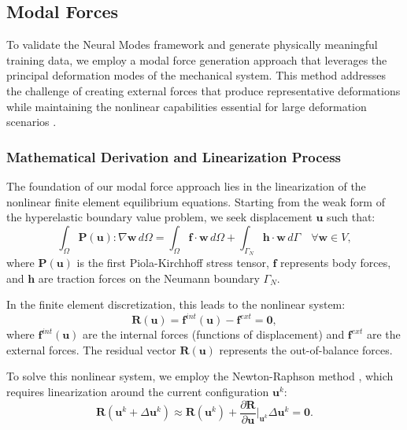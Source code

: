 \subsection{Modal Forces}
\label{sec:modal_forces}

To validate the Neural Modes framework and generate physically meaningful training data, we employ a modal force generation approach that leverages the principal deformation modes of the mechanical system. This method addresses the challenge of creating external forces that produce representative deformations while maintaining the nonlinear capabilities essential for large deformation scenarios \cite{odotDeepPhysicsPhysicsAware2021}.

\subsubsection{Mathematical Derivation and Linearization Process}

The foundation of our modal force approach lies in the linearization of the nonlinear finite element equilibrium equations. Starting from the weak form of the hyperelastic boundary value problem, we seek displacement $\bm{u}$ such that:
\begin{equation}
    \int_{\Omega} \bm{P}(\bm{u}) : \nabla \bm{w} \, d\Omega = \int_{\Omega} \bm{f} \cdot \bm{w} \, d\Omega + \int_{\Gamma_N} \bm{h} \cdot \bm{w} \, d\Gamma \quad \forall \bm{w} \in V,
\end{equation}
where $\bm{P}(\bm{u})$ is the first Piola-Kirchhoff stress tensor, $\bm{f}$ represents body forces, and $\bm{h}$ are traction forces on the Neumann boundary $\Gamma_N$.

In the finite element discretization, this leads to the nonlinear system:
\begin{equation}
    \bm{R}(\bm{u}) = \bm{f}^{int}(\bm{u}) - \bm{f}^{ext} = \bm{0},
\end{equation}
where $\bm{f}^{int}(\bm{u})$ are the internal forces (functions of displacement) and $\bm{f}^{ext}$ are the external forces. The residual vector $\bm{R}(\bm{u})$ represents the out-of-balance forces.

To solve this nonlinear system, we employ the Newton-Raphson method \cite{Dedieu_2015}, which requires linearization around the current configuration $\bm{u}^k$:
\begin{equation}
    \bm{R}(\bm{u}^k + \Delta\bm{u}^k) \approx \bm{R}(\bm{u}^k) + \frac{\partial \bm{R}}{\partial \bm{u}}\bigg|_{\bm{u}^k} \Delta\bm{u}^k = \bm{0}.
\end{equation}


